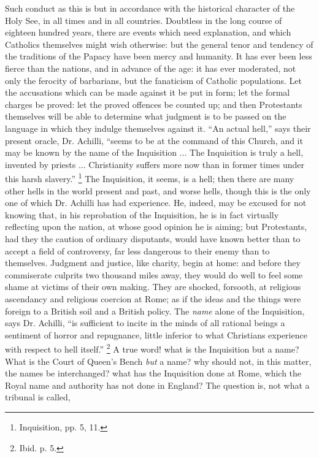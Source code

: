 Such conduct as this is but in accordance with the
historical character of the Holy See, in all times and in
all countries. Doubtless in the long course of eighteen
hundred years, there are events which need explanation,
and which Catholics themselves might wish otherwise: but
the general tenor and tendency of the traditions of the
Papacy have been mercy and humanity. It has ever been
less fierce than the nations, and in advance of the age:
it has ever moderated, not only the ferocity of
barbarians, but the fanaticism of Catholic populations.
Let the accusations which can be made against it be put
in form; let the formal charges be proved: let the proved
offences be counted up; and then Protestants themselves
will be able to determine what judgment is to be passed
on the language in which they indulge themselves against
it. ``An actual hell,'' says their present
oracle, Dr. Achilli, ``seems to be at the command of
this Church, and it may be known by the name of the
Inquisition ... The Inquisition is truly a hell, invented
by priests ... Christianity suffers more now than in
former times under this harsh slavery.'' \footnote{Inquisition, pp. 5, 11.} The
Inquisition, it seems, is a hell; then there are many
other hells in the world present and past, and worse
hells, though this is the only one of which Dr. Achilli
has had experience. He, indeed, may be excused for not
knowing that, in his reprobation of the Inquisition, he
is in fact virtually reflecting upon the nation, at whose
good opinion he is aiming; but Protestants, had they the
caution of ordinary disputants, would have known better
than to accept a field of controversy, far less dangerous
to their enemy than to themselves. Judgment and justice,
like charity, begin at home: and before they commiserate
culprits two thousand miles away, they would do well to
feel some shame at victims of their own making. They are
shocked, forsooth, at religious ascendancy and religious
coercion at Rome; as if the ideas and the things were
foreign to a British soil and a British policy. The \emph{name}
alone of the Inquisition, says Dr. Achilli, ``is
sufficient to incite in the minds of all rational beings
a sentiment of horror and repugnance, little inferior to
what Christians experience with respect to hell
itself.'' \footnote{Ibid. p. 5.} A true word! what is the Inquisition but a name?
What is the Court of Queen's Bench \emph{but} a name?
why should not, in this matter, the names be
interchanged? what has the Inquisition done at Rome,
which the Royal name and authority has not done in
England? The question is, not what a tribunal is called,

